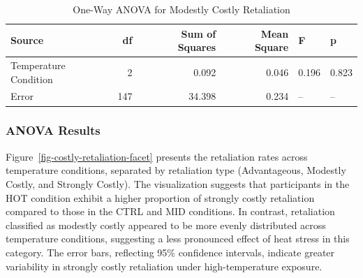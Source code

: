 \documentclass[
  man,
  floatsintext,
  longtable,
  nolmodern,
  notxfonts,
  notimes,
  colorlinks=true,linkcolor=blue,citecolor=blue,urlcolor=blue]{apa7}
\begin{document}
\begin{table}

{\caption{{One-Way ANOVA for Modestly Costly
Retaliation}{\label{tbl-anova-modestly-table}}}
\vspace{-20pt}}

\centering
\begin{tabular}[t]{lrrrll}
\toprule
Source & df & Sum of Squares & Mean Square & F & p\\
\midrule
Temperature Condition & 2 & 0.092 & 0.046 & 0.196 & 0.823\\
Error & 147 & 34.398 & 0.234 & -- & --\\
\bottomrule
\end{tabular}

\end{table}

\begin{table}

{\caption{{One-Way ANOVA for Stongly Costly
Retaliation}{\label{tbl-anova-strongly-table}}}
\vspace{-20pt}}

\centering\centering
{}

\end{table}

\subsubsection{ANOVA Results}\label{anova-results}

Figure~\ref{fig-costly-retaliation-facet} presents the retaliation rates
across temperature conditions, separated by retaliation type
(Advantageous, Modestly Costly, and Strongly Costly). The visualization
suggests that participants in the HOT condition exhibit a higher
proportion of strongly costly retaliation compared to those in the CTRL
and MID conditions. In contrast, retaliation classified as modestly
costly appeared to be more evenly distributed across temperature
conditions, suggesting a less pronounced effect of heat stress in this
category. The error bars, reflecting 95\% confidence intervals, indicate
greater variability in strongly costly retaliation under
high-temperature exposure.
\end{document}
